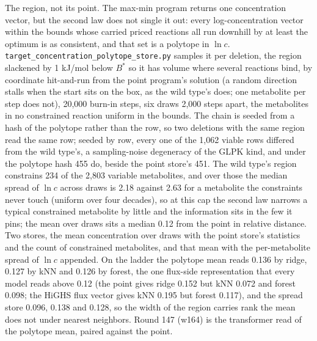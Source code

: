 The region, not its point. The max-min program returns one concentration vector, but
the second law does not single it out: every log-concentration vector within the bounds
whose carried priced reactions all run downhill by at least the optimum is as
consistent, and that set is a polytope in $\ln c$.
\texttt{target\_concentration\_polytope\_store.py} samples it per deletion, the region
slackened by 1 kJ/mol below $B^*$ so it has volume where several reactions bind, by
coordinate hit-and-run from the point program's solution (a random direction stalls when
the start sits on the box, as the wild type's does; one metabolite per step does not),
20,000 burn-in steps, six draws 2,000 steps apart, the metabolites in no constrained
reaction uniform in the bounds. The chain is seeded from a hash of the polytope rather
than the row, so two deletions with the same region read the same row; seeded by row,
every one of the 1,062 viable rows differed from the wild type's, a sampling-noise
degeneracy of the GLPK kind, and under the polytope hash 455 do, beside the point
store's 451. The wild type's region constrains 234 of the 2,803 variable metabolites,
and over those the median spread of $\ln c$ across draws is 2.18 against 2.63 for a
metabolite the constraints never touch (uniform over four decades), so at this cap the
second law narrows a typical constrained metabolite by little and the information sits
in the few it pins; the mean over draws sits a median 0.12 from the point in relative
distance. Two stores, the mean concentration over draws with the point store's
statistics and the count of constrained metabolites, and that mean with the per-metabolite
spread of $\ln c$ appended. On the ladder the polytope mean reads 0.136 by ridge, 0.127
by kNN and 0.126 by forest, the one flux-side representation that every model reads above
0.12 (the point gives ridge 0.152 but kNN 0.072 and forest 0.098; the HiGHS flux vector
gives kNN 0.195 but forest 0.117), and the spread store 0.096, 0.138 and 0.128, so the
width of the region carries rank the mean does not under nearest neighbors. Round 147
(w164) is the transformer read of the polytope mean, paired against the point.

